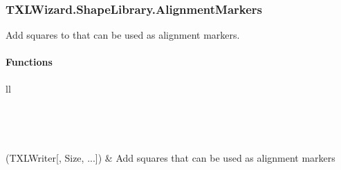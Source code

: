 \documentclass[letterpaper,10pt,english]{sphinxmanual}
\begin{document}
\subsubsection{TXLWizard.ShapeLibrary.AlignmentMarkers}
\label{Chapters/PythonModuleReference/ShapeLibrary/TXLWizard.ShapeLibrary.AlignmentMarkers:txlwizard-shapelibrary-alignmentmarkers}\label{Chapters/PythonModuleReference/ShapeLibrary/TXLWizard.ShapeLibrary.AlignmentMarkers:module-TXLWizard.ShapeLibrary.AlignmentMarkers}\label{Chapters/PythonModuleReference/ShapeLibrary/TXLWizard.ShapeLibrary.AlignmentMarkers::doc}
Add squares to  that can be used as alignment markers.


\paragraph{Functions}
\label{Chapters/PythonModuleReference/ShapeLibrary/TXLWizard.ShapeLibrary.AlignmentMarkers:functions}
\begin{longtable}{ll}
\hline
\endfirsthead

%
{{}} \\
\hline
\endhead

\hline {} \\ \hline
\endfoot

\endlastfoot


{\hyperref[Chapters/PythonModuleReference/ShapeLibrary/TXLWizard.ShapeLibrary.AlignmentMarkers:TXLWizard.ShapeLibrary.AlignmentMarkers.GetAlignmentMarkers]{}}(TXLWriter{[}, Size, ...{]})
 & 
Add squares that can be used as alignment markers
\\
\hline\end{longtable}

\end{document}
